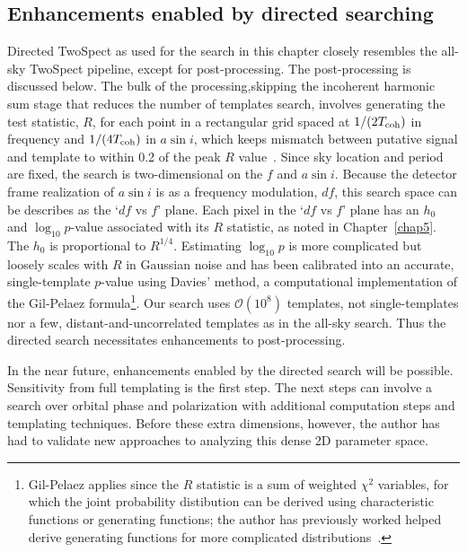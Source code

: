 
            \subsection{Enhancements enabled by directed searching}
            \label{directed_enhancements}

Directed TwoSpect as used for the search in this chapter closely resembles the all-sky TwoSpect pipeline, except for post-processing. 
The post-processing is discussed below.
The bulk of the processing,skipping the incoherent harmonic sum stage that reduces the number of templates search, involves generating the test statistic, $R$, for each point in a rectangular grid spaced at $1/(2T_\textup{coh})$ in frequency and $1/(4T_\textup{coh})$ in $a \sin i$, which keeps mismatch between putative signal and template to within 0.2 of the peak $R$ value~\cite{GoetzTwoSpectMethods2011}.
Since sky location and period are fixed, the search is two-dimensional on the $f$ and $a \sin i$. 
Because the detector frame realization of $a \sin i$ is as a frequency modulation, $df$, this search space can be describes as the `$df$ vs $f$' plane.
Each pixel in the `$df$ vs $f$' plane has an $h_0$ and $\log_{10} p$-value associated with its $R$ statistic, as noted in Chapter~\ref{chap5}.
The $h_0$ is proportional to $R^{1/4}$.
Estimating $\log_{10} p$ is more complicated but loosely scales with $R$ in Gaussian noise and has been calibrated into an accurate, single-template $p$-value using Davies' method, a computational implementation of the Gil-Pelaez formula\footnote{Gil-Pelaez applies since the $R$ statistic is a sum of weighted $\chi^2$ variables, for which the joint probability distibution can be derived using characteristic functions or generating functions; the author has previously worked helped derive generating functions for more complicated distributions~\cite{RomeroThesis}.}.
Our search uses $\mathcal{O}(10^8)$ templates, not single-templates nor a few, distant-and-uncorrelated templates as in the all-sky search.
Thus the directed search necessitates enhancements to post-processing.

In the near future, enhancements enabled by the directed search will be possible.
Sensitivity from full templating is the first step.
The next steps can involve a search over orbital phase and polarization with additional computation steps and templating techniques.
Before these extra dimensions, however, the author has had to validate new approaches to analyzing this dense 2D parameter space.


